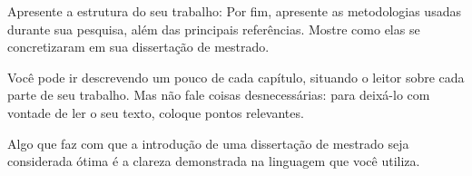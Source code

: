 Apresente a estrutura do seu trabalho: Por fim, apresente as metodologias usadas durante sua pesquisa, além das principais referências. Mostre como elas se concretizaram em sua dissertação de mestrado.

Você pode ir descrevendo um pouco de cada capítulo, situando o leitor sobre cada parte de seu trabalho. Mas não fale coisas desnecessárias: para deixá-lo com vontade de ler o seu texto, coloque pontos relevantes.

Algo que faz com que a introdução de uma dissertação de mestrado seja considerada ótima é a clareza demonstrada na linguagem que você utiliza.


